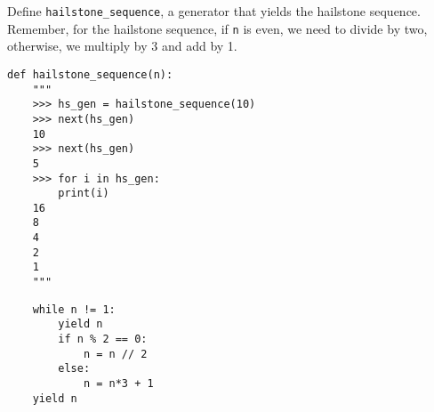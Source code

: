 \begin{blocksection}
\question Define \lstinline$hailstone_sequence$, a generator that yields the hailstone sequence. Remember, for the hailstone sequence, if \lstinline$n$ is even, we need to divide by two, otherwise, we multiply by 3 and add by 1.

\begin{lstlisting}
def hailstone_sequence(n):
    """
    >>> hs_gen = hailstone_sequence(10)
    >>> next(hs_gen)
    10
    >>> next(hs_gen)
    5
    >>> for i in hs_gen:
   	    print(i)
    16
    8
    4
    2
    1
    """
\end{lstlisting}

\begin{solution}[1.5in]
\begin{lstlisting}
    while n != 1:
        yield n
        if n % 2 == 0:
            n = n // 2
        else:
            n = n*3 + 1
    yield n
\end{lstlisting}
\end{solution}
\end{blocksection}

